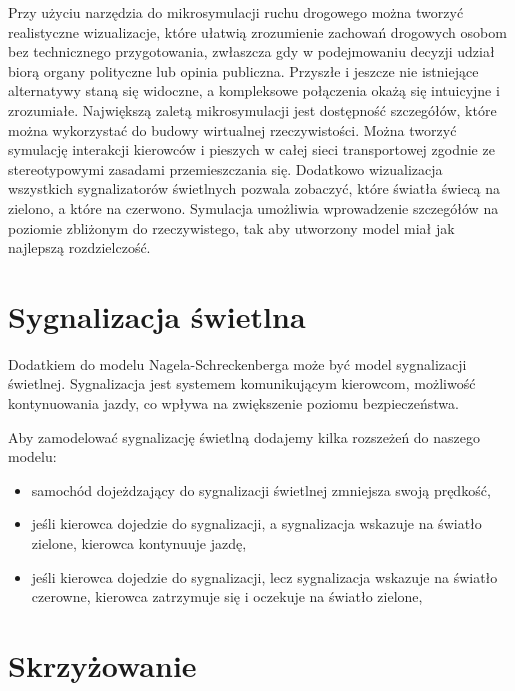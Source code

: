 \documentclass{sprawozdanie-agh}
\begin{document}
	Przy użyciu narzędzia do mikrosymulacji ruchu drogowego można tworzyć realistyczne wizualizacje, które ułatwią zrozumienie zachowań drogowych osobom bez technicznego przygotowania, zwłaszcza gdy w podejmowaniu decyzji udział biorą organy polityczne lub opinia publiczna. Przyszłe i jeszcze nie istniejące alternatywy staną się widoczne, a kompleksowe połączenia okażą się intuicyjne i zrozumiałe.
	Największą zaletą mikrosymulacji jest dostępność szczegółów, które można wykorzystać do budowy wirtualnej rzeczywistości. Można tworzyć symulację interakcji kierowców i pieszych w całej sieci transportowej zgodnie ze stereotypowymi zasadami przemieszczania się. Dodatkowo wizualizacja wszystkich sygnalizatorów świetlnych pozwala zobaczyć, które światła świecą na zielono, a które na czerwono. Symulacja umożliwia wprowadzenie szczegółów na poziomie zbliżonym do rzeczywistego, tak aby utworzony model miał jak najlepszą rozdzielczość.



	\section{Sygnalizacja świetlna}

	Dodatkiem do modelu Nagela-Schreckenberga może być model sygnalizacji świetlnej. Sygnalizacja jest systemem komunikującym kierowcom, możliwość kontynuowania jazdy, co wpływa na zwiększenie poziomu bezpieczeństwa.

	Aby zamodelować sygnalizację świetlną dodajemy kilka rozszeżeń do naszego modelu:
	\begin{itemize}
		\item samochód dojeżdzający do sygnalizacji świetlnej zmniejsza swoją prędkość,
		\item jeśli kierowca dojedzie do sygnalizacji, a sygnalizacja wskazuje na światło zielone, kierowca kontynuuje jazdę,
		\item jeśli kierowca dojedzie do sygnalizacji, lecz sygnalizacja wskazuje na światło czerowne, kierowca zatrzymuje się i oczekuje na światło zielone,
	\end{itemize}


	\section{Skrzyżowanie}
\end{document}

